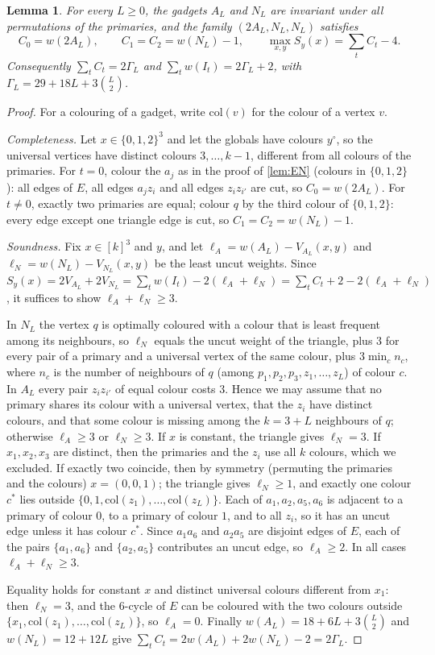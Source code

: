 \documentclass[11pt,letterpaper]{article}
\newtheorem{lemma}[theorem]{Lemma}
\theoremstyle{remark}
\newcommand{\col}{\mathrm{col}}
\newcommand{\yc}{y^{\circ}}
\begin{document}
\begin{lemma}\label{lem:family-values}
For every $L\ge0$, the gadgets $A_L$ and $N_L$ are invariant under all permutations of the primaries,
and the family $(2A_L,N_L,N_L)$ satisfies
\[
C_0=w(2A_L),\qquad C_1=C_2=w(N_L)-1,\qquad \max_{x,y}S_y(x)=\textstyle\sum_tC_t-4 .
\]
Consequently $\sum_tC_t=2\Gamma_L$ and $\sum_tw(I_t)=2\Gamma_L+2$, with $\Gamma_L=29+18L+3\binom L2$.
\end{lemma}

\begin{proof}
For a colouring of a gadget, write $\col(v)$ for the colour of a vertex $v$.

\emph{Completeness.} Let $x\in\{0,1,2\}^3$ and let the globals have colours $\yc$, so the universal
vertices have distinct colours $3,\dots,k-1$, different from all colours of the primaries. For $t=0$,
colour the $a_j$ as in the proof of \cref{lem:EN} (colours in $\{0,1,2\}$): all edges of $E$, all edges
$a_jz_i$ and all edges $z_iz_{i'}$ are cut, so $C_0=w(2A_L)$. For $t\neq0$, exactly two primaries are
equal; colour $q$ by the third colour of $\{0,1,2\}$: every edge except one triangle edge is cut, so
$C_1=C_2=w(N_L)-1$.

\emph{Soundness.} Fix $x\in[k]^3$ and $y$, and let $\ell_A=w(A_L)-V_{A_L}(x,y)$ and
$\ell_N=w(N_L)-V_{N_L}(x,y)$ be the least uncut weights. Since
$S_y(x)=2V_{A_L}+2V_{N_L}=\sum_tw(I_t)-2(\ell_A+\ell_N)=\sum_tC_t+2-2(\ell_A+\ell_N)$, it suffices to show
$\ell_A+\ell_N\ge3$.

In $N_L$ the vertex $q$ is optimally coloured with a colour that is least frequent among its neighbours,
so $\ell_N$ equals the uncut weight of the triangle, plus $3$ for every pair of a primary and a universal
vertex of the same colour, plus $3\min_cn_c$, where $n_c$ is the number of neighbours of $q$ (among
$p_1,p_2,p_3,z_1,\dots,z_L$) of colour $c$. In $A_L$ every pair
$z_iz_{i'}$ of equal colour costs $3$. Hence we may assume that no primary shares its colour with a
universal vertex, that the $z_i$ have distinct colours, and that some colour is missing among the
$k=3+L$ neighbours of $q$; otherwise $\ell_A\ge3$ or $\ell_N\ge3$. If $x$ is constant, the triangle gives
$\ell_N=3$. If $x_1,x_2,x_3$ are distinct, then the primaries and the $z_i$ use all $k$ colours, which we
excluded. If exactly two coincide, then by symmetry (permuting the primaries and the colours) $x=(0,0,1)$; the
triangle gives $\ell_N\ge1$, and exactly one colour $c^\ast$ lies outside
$\{0,1,\col(z_1),\dots,\col(z_L)\}$. Each of $a_1,a_2,a_5,a_6$ is adjacent to a primary of colour $0$, to a
primary of colour $1$, and to all $z_i$, so it has an uncut edge unless it has colour $c^\ast$. Since $a_1a_6$ and $a_2a_5$ are disjoint edges of $E$, each of the pairs
$\{a_1,a_6\}$ and $\{a_2,a_5\}$ contributes an uncut edge, so $\ell_A\ge2$. In all cases $\ell_A+\ell_N\ge3$.

Equality holds for constant $x$ and distinct universal colours different from $x_1$: then $\ell_N=3$, and
the $6$-cycle of $E$ can be coloured with the two colours outside $\{x_1,\col(z_1),\dots,\col(z_L)\}$, so
$\ell_A=0$. Finally $w(A_L)=18+6L+3\binom L2$ and $w(N_L)=12+12L$ give
$\sum_tC_t=2w(A_L)+2w(N_L)-2=2\Gamma_L$.
\end{proof}
\end{document}
